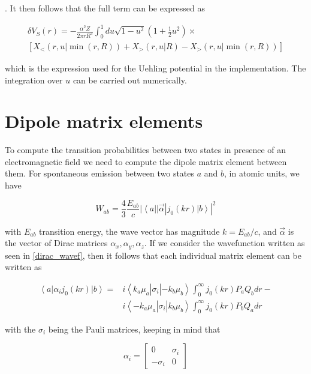 \documentclass[]{report}
\newcommand{\bra}[1]{\left<#1\right|}
\newcommand{\ket}[1]{\left|#1\right>}
\newcommand{\braket}[3]{\bra{#1}#2\ket{#3}}
\begin{document}
. It then follows that the full term can be expressed as

\begin{multline}
\delta V_S(r) =  -\frac{\alpha^2Z}{2\pi rR^3}\int_0^1 du \sqrt{1-u^2}\left(1+\frac{1}{2}u^2\right) \times \\
\left[X_{<}(r, u | \min(r, R)) + X_{>}(r, u | R) -X_{>}(r, u | \min(r, R))\right]
\end{multline}

which is the expression used for the Uehling potential in the implementation. The integration over $u$ can be carried out numerically.

\section{Dipole matrix elements}

To compute the transition probabilities between two states in presence of an electromagnetic field we need to compute the dipole matrix element between them. For spontaneous emission between two states $a$ and $b$, in atomic units, we have \cite{payne1955}

\begin{equation}\label{trans_prob}
W_{ab} = \frac{4}{3}\frac{E_{ab}}{c}|\braket{a}{|\vec{\alpha}|j_0(kr)}{b}|^2
\end{equation}

with $E_{ab}$ transition energy, the wave vector has magnitude $k=E_{ab}/c$, and $\vec{\alpha}$ is the vector of Dirac matrices $\alpha_x, \alpha_y, \alpha_z$.
If we consider the wavefunction written as seen in \ref{dirac_wavef}, 
then it follows that each individual matrix element can be written as

\begin{align}\label{matel_alphaj0}
\braket{a}{\alpha_ij_0(kr)}{b} = & i\braket{k_a\mu_a}{\sigma_i}{-k_b\mu_b}\int_{0}^{\infty}j_0(kr)P_aQ_b dr - \\
& i\braket{-k_a\mu_a}{\sigma_i}{k_b\mu_b}\int_{0}^{\infty}j_0(kr)P_bQ_a dr \nonumber
\end{align}

with the $\sigma_i$ being the Pauli matrices, keeping in mind that

\begin{equation}
\alpha_i = \begin{bmatrix}
0 & \sigma_i \\
-\sigma_i & 0
\end{bmatrix}
\end{equation}
\end{document}
